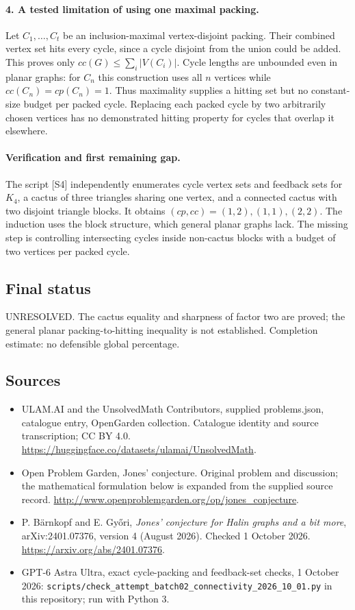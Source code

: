 \documentclass[11pt,a4paper]{article}
\begin{document}
\paragraph{4. A tested limitation of using one maximal packing.}
Let $C_1,\ldots,C_t$ be an inclusion-maximal vertex-disjoint packing.
Their combined vertex set hits every cycle, since a cycle disjoint
from the union could be added. This proves only
$cc(G)\le\sum_i|V(C_i)|$. Cycle lengths are unbounded even in planar
graphs: for $C_n$ this construction uses all $n$ vertices while
$cc(C_n)=cp(C_n)=1$. Thus maximality supplies a hitting set but no
constant-size budget per packed cycle. Replacing each packed cycle
by two arbitrarily chosen vertices has no demonstrated hitting
property for cycles that overlap it elsewhere.

\paragraph{Verification and first remaining gap.}
The script [S4] independently enumerates cycle vertex sets and feedback
sets for $K_4$, a cactus of three triangles sharing one vertex, and
a connected cactus with two disjoint triangle blocks. It obtains
$(cp,cc)=(1,2),(1,1),(2,2)$. The induction uses the block structure,
which general planar graphs lack. The missing step is controlling
intersecting cycles inside non-cactus blocks with a budget of two
vertices per packed cycle.

\subsection{Final status}
UNRESOLVED. The cactus equality and sharpness of factor two are proved;
the general planar packing-to-hitting inequality is not established.
Completion estimate: no defensible global percentage.

\subsection{Sources}
\begin{itemize}
\item[S1] ULAM.AI and the UnsolvedMath Contributors, supplied problems.json, catalogue entry, OpenGarden collection. Catalogue identity and source transcription; CC BY 4.0.
\url{https://huggingface.co/datasets/ulamai/UnsolvedMath}.
\item[S2] Open Problem Garden, Jones' conjecture. Original problem and discussion; the mathematical formulation below is expanded from the supplied source record.
\url{http://www.openproblemgarden.org/op/jones_conjecture}.
\item[S3] P. Bärnkopf and E. Győri, \emph{Jones' conjecture for Halin graphs and a bit more}, arXiv:2401.07376, version 4 (August 2026). Checked 1 October 2026.
\url{https://arxiv.org/abs/2401.07376}.
\item[S4] GPT-6 Astra Ultra, exact cycle-packing and feedback-set checks, 1 October 2026: \texttt{scripts/check\_attempt\_batch02\_connectivity\_2026\_10\_01.py} in this repository; run with Python 3.
\end{itemize}
\end{document}
